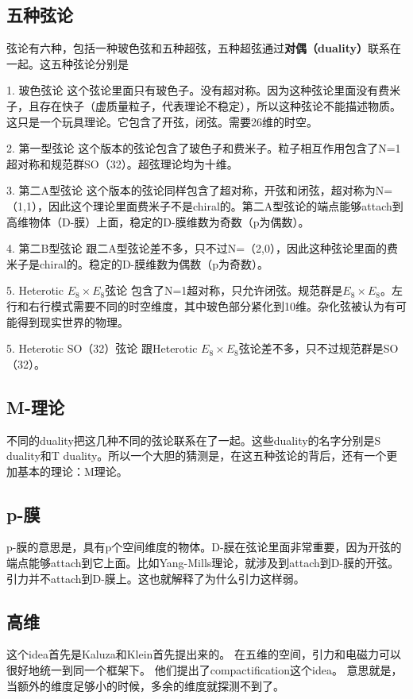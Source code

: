 
\begin{issues}
\issueNeedCite
\issueMissDepend
\end{issues}

\subsection{五种弦论}

弦论有六种，包括一种玻色弦和五种超弦，五种超弦通过\textbf{对偶（duality）}联系在一起。这五种弦论分别是

1. 玻色弦论
这个弦论里面只有玻色子。没有超对称。因为这种弦论里面没有费米子，且存在快子（虚质量粒子，代表理论不稳定），所以这种弦论不能描述物质。这只是一个玩具理论。它包含了开弦，闭弦。需要26维的时空。

2. 第一型弦论
这个版本的弦论包含了玻色子和费米子。粒子相互作用包含了N=1超对称和规范群SO（32）。超弦理论均为十维。

3. 第二A型弦论
这个版本的弦论同样包含了超对称，开弦和闭弦，超对称为N=（1,1），因此这个理论里面费米子不是chiral的。第二A型弦论的端点能够attach到高维物体（D-膜）上面，稳定的D-膜维数为奇数（p为偶数）。

4. 第二B型弦论
跟二A型弦论差不多，只不过N=（2,0），因此这种弦论里面的费米子是chiral的。稳定的D-膜维数为偶数（p为奇数）。

5. Heterotic $E_8\times E_8$弦论
包含了N=1超对称，只允许闭弦。规范群是$E_8\times E_8$。左行和右行模式需要不同的时空维度，其中玻色部分紧化到10维。杂化弦被认为有可能得到现实世界的物理。

5. Heterotic SO（32）弦论
跟Heterotic $E_8\times E_8$弦论差不多，只不过规范群是SO（32）。

\subsection{M-理论}
不同的duality把这几种不同的弦论联系在了一起。这些duality的名字分别是S duality和T duality。所以一个大胆的猜测是，在这五种弦论的背后，还有一个更加基本的理论：M理论。

\subsection{p-膜}
p-膜的意思是，具有p个空间维度的物体。D-膜在弦论里面非常重要，因为开弦的端点能够attach到它上面。比如Yang-Mills理论，就涉及到attach到D-膜的开弦。 引力并不attach到D-膜上。这也就解释了为什么引力这样弱。

\subsection{高维}
这个idea首先是Kaluza和Klein首先提出来的。 在五维的空间，引力和电磁力可以很好地统一到同一个框架下。 他们提出了compactification这个idea。
意思就是，当额外的维度足够小的时候，多余的维度就探测不到了。 

